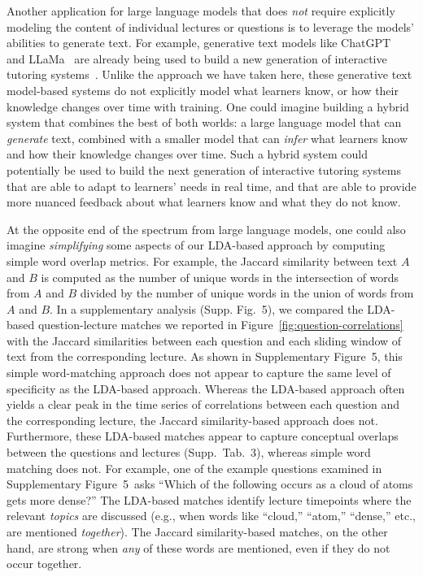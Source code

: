 \documentclass[10pt]{article}
\newcommand{\matchTab}{3}
\newcommand{\jaccard}{5}
\begin{document}
Another application for large language models that does \textit{not} require
explicitly modeling the content of individual lectures or questions is to
leverage the models' abilities to generate text. For example, generative text
models like ChatGPT~\citep{ChatGPT} and LLaMa~\citep{TouvEtal23} are already
being used to build a new generation of interactive tutoring
systems~\citep[e.g.,][]{MannEtal23b}. Unlike the approach we have taken here,
these generative text model-based systems do not explicitly model what learners
know, or how their knowledge changes over time with training. One could imagine
building a hybrid system that combines the best of both worlds: a large
language model that can \textit{generate} text, combined with a smaller model
that can \textit{infer} what learners know and how their knowledge changes over
time. Such a hybrid system could potentially be used to build the next
generation of interactive tutoring systems that are able to adapt to learners'
needs in real time, and that are able to provide more nuanced feedback about
what learners know and what they do not know.

At the opposite end of the spectrum from large language models, one could also
imagine \textit{simplifying} some aspects of our LDA-based approach by
computing simple word overlap metrics. For example, the Jaccard similarity
between text $A$ and $B$ is computed as the number of unique words in the
intersection of words from $A$ and $B$ divided by the number of unique words in
the union of words from $A$ and $B$. In a supplementary analysis (Supp.
Fig.~\jaccard), we compared the LDA-based question-lecture matches we reported
in Figure~\ref{fig:question-correlations} with the Jaccard similarities between
each question and each sliding window of text from the corresponding lecture.
As shown in Supplementary Figure~\jaccard, this simple word-matching approach
does not appear to capture the same level of specificity as the LDA-based
approach. Whereas the LDA-based approach often yields a clear peak in the
time series of correlations between each question and the corresponding lecture,
the Jaccard similarity-based approach does not. Furthermore, these LDA-based
matches appear to capture conceptual overlaps between the questions and
lectures (Supp.~Tab.~\matchTab), whereas simple word matching does not. For
example, one of the example questions examined in Supplementary
Figure~\jaccard~asks ``Which of the following occurs as a cloud of atoms gets
more dense?'' The LDA-based matches identify lecture timepoints where the
relevant \textit{topics} are discussed (e.g., when words like ``cloud,''
``atom,'' ``dense,'' etc., are mentioned \textit{together}). The Jaccard
similarity-based matches, on the other hand, are strong when \textit{any} of
these words are mentioned, even if they do not occur together.
\end{document}
